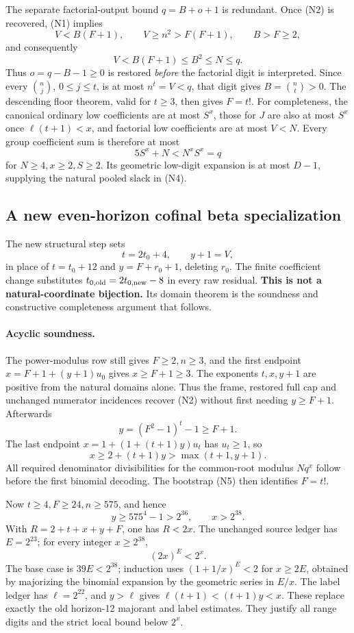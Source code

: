 The separate factorial-output bound \(q=B+o+1\) is redundant.  Once
(N2) is recovered, (N1) implies
\[
 V<B(F+1),\qquad V\ge n^2>F(F+1),\qquad B>F\ge2,
\]
and consequently
\[
 V<B(F+1)\le B^2\le N\le q.
 \tag{N5}
\]
Thus \(o=q-B-1\ge0\) is restored \emph{before} the factorial digit is
interpreted.  Since every \(\binom nj\), \(0\le j\le t\), is at most
\(n^t=V<q\), that digit gives \(B=\binom nt>0\).
The descending floor theorem, valid for \(t\ge3\), then gives \(F=t!\).
For completeness, the canonical ordinary low coefficients are at most
\(S^x\), those for \(J\) are also at most \(S^x\) once
\(\ell(t+1)<x\), and factorial low coefficients are at most \(V<N\).
Every group coefficient sum is therefore at most
\[
 5S^x+N<N^xS^x=q
\]
for \(N\ge4,x\ge2,S\ge2\).  Its geometric low-digit expansion is at
most \(D-1\), supplying the natural pooled slack in (N4).

\subsection{A new even-horizon cofinal beta specialization}

The new structural step sets
\[
 t=2t_0+4,\qquad y+1=V,
 \tag{N6}
\]
in place of \(t=t_0+12\) and \(y=F+r_0+1\), deleting \(r_0\).
The finite coefficient change substitutes
\(t_{0,\rm old}=2t_{0,\rm new}-8\) in every raw residual.
\textbf{This is not a natural-coordinate bijection.}  Its domain theorem
is the soundness and constructive completeness argument that follows.

\paragraph{Acyclic soundness.}
The power-modulus row still gives \(F\ge2,n\ge3\), and the first endpoint
\(x=F+1+(y+1)u_0\) gives \(x\ge F+1\ge3\).
The exponents \(t,x,y+1\) are positive from the natural domains alone.
Thus the frame, restored full cap and unchanged numerator incidences
recover (N2) without first needing \(y\ge F+1\).
Afterwards
\[
 y=(F^2-1)^t-1\ge F+1.
\]
The last endpoint \(x=1+(1+(t+1)y)u_t\) has \(u_t\ge1\), so
\[
 x\ge2+(t+1)y>\max(t+1,y+1).
 \tag{N7}
\]
All required denominator divisibilities for the common-root modulus
\(Nq^x\) follow before the first binomial decoding.
The bootstrap (N5) then identifies \(F=t!\).

Now \(t\ge4,F\ge24,n\ge575\), and hence
\[
 y\ge575^4-1>2^{36},\qquad x>2^{38}.
\]
With \(R=2+t+x+y+F\), one has \(R<2x\).
The unchanged source ledger has \(E=2^{23}\); for every integer
\(x\ge2^{38}\),
\[
 (2x)^E<2^x.
\]
The base case is \(39E<2^{38}\); induction uses
\((1+1/x)^E<2\) for \(x\ge2E\), obtained by majorizing the binomial
expansion by the geometric series in \(E/x\).
The label ledger has \(\ell=2^{22}\), and \(y>\ell\) gives
\(\ell(t+1)<(t+1)y<x\).
These replace exactly the old horizon-12 majorant and label estimates.
They justify all range digits and the strict local bound below \(2^x\).

